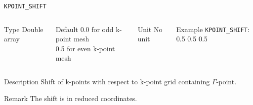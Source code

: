 \begin{frame}[allowframebreaks]{\texttt{KPOINT\_SHIFT}} \label{KPOINT_SHIFT}
\vspace*{-12pt}
\begin{columns}
\begin{block}{Type}
Double array
\end{block}

\begin{block}{Default}
 0.0 for odd k-point mesh\\
 0.5 for even k-point mesh
\end{block}

\begin{block}{Unit}
No unit
\end{block}

\begin{block}{Example}
\texttt{KPOINT\_SHIFT}: 0.5 0.5 0.5
\end{block}
\end{columns}

\begin{block}{Description}
Shift of k-points with respect to k-point grid containing $\Gamma$-point.
\end{block}

\begin{block}{Remark}
The shift is in reduced coordinates. 
\end{block}

\end{frame}


